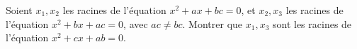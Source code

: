 Soient $x_1, x_2$ les racines de l'équation $x^2 + ax + bc = 0$, et $x_2, x_3$ les racines de l'équation $x^2 + bx + ac = 0$, avec $ac \neq bc$. Montrer que $x_1, x_3$ sont les racines de l'équation $x^2 + cx + ab = 0$.
